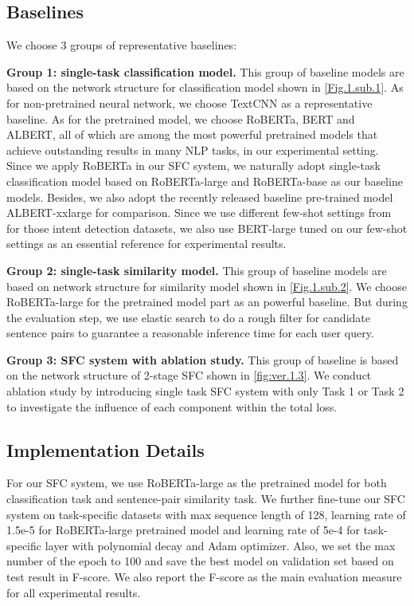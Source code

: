 \documentclass[letterpaper]{article} %
\begin{document}
  \subsection{Baselines}
  We choose 3 groups of representative baselines:

  \textbf{Group  1:  single-task  classification  model.} This group of baseline
  models  are  based  on the network structure for classification model shown in
  \ref{Fig.1.sub.1}.   As   for   non-pretrained   neural   network,  we  choose
  TextCNN \cite{kim2014convolutional}  as  a  representative baseline. As for the
  pretrained  model,  we choose RoBERTa, BERT and ALBERT, all of which are among
  the  most  powerful pretrained models that achieve outstanding results in many
  NLP  tasks,  in  our  experimental  setting. Since we apply RoBERTa in our SFC
  system,   we   naturally  adopt  single-task  classification  model  based  on
  RoBERTa-large  and RoBERTa-base as our baseline models. Besides, we also adopt
  the       recently       released       baseline       pre-trained       model
  ALBERT-xxlarge \cite{lan2019albert}  for  comparison.  Since  we  use different
  few-shot   settings   from    \cite{casanueva2020efficient}  for  those  intent
  detection  datasets,  we also use BERT-large tuned on our few-shot settings as
  an essential reference for experimental results.


  \textbf{Group  2: single-task similarity model.} This group of baseline models
  are   based   on   network   structure   for   similarity   model   shown   in
  \ref{Fig.1.sub.2}. We choose RoBERTa-large for the pretrained model part as an
  powerful baseline. But during the evaluation step, we use elastic search to do
  a  rough  filter  for  candidate  sentence  pairs  to  guarantee  a reasonable
  inference time for each user query.

  \textbf{Group  3:  SFC  system with ablation study.} This group of baseline is
  based  on  the network structure of 2-stage SFC shown in \ref{fig:ver.1.3}. We
  conduct  ablation study by introducing single task SFC system with only Task 1
  or  Task  2  to  investigate  the influence of each component within the total
  loss.

  \subsection{Implementation Details}
  For  our  SFC  system,  we  use RoBERTa-large as the pretrained model for both
  classification  task  and  sentence-pair similarity task. We further fine-tune
  our  SFC  system  on  task-specific  datasets with max sequence length of 128,
  learning  rate  of 1.5e-5 for RoBERTa-large pretrained model and learning rate
  of  5e-4  for  task-specific  layer  with polynomial decay and Adam optimizer.
  Also,  we  set  the  max number of the epoch to 100 and save the best model on
  validation  set based on test result in F-score. We also report the F-score as
  the main evaluation measure for all experimental results.
\end{document}
